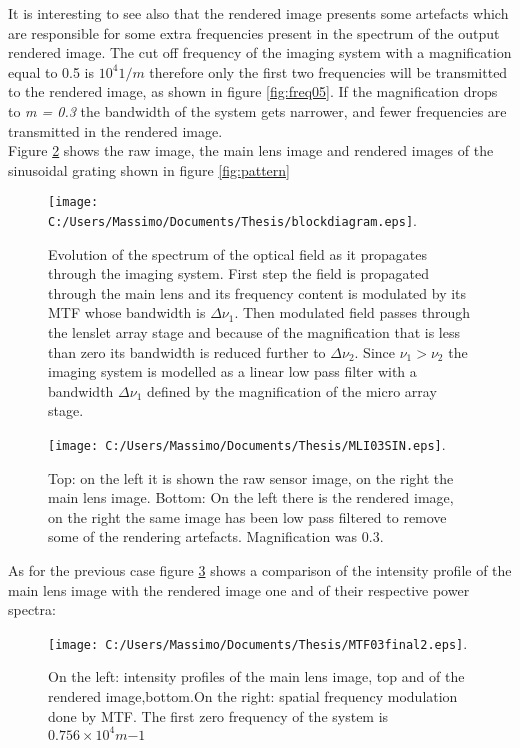   It is interesting to see also that the rendered image presents some artefacts which are responsible for some extra frequencies present in the spectrum of the output rendered image. The cut off frequency of the imaging system with a magnification equal to 0.5 is $10^4 1/m$ therefore only the first two frequencies will be transmitted to the rendered image, as shown in figure \ref{fig:freq05}.
    If the magnification drops to \textit{m = 0.3} the bandwidth of the system gets narrower, and fewer frequencies are transmitted in the rendered image.
    \\
    Figure \ref{fig:image03} shows the raw image, the main lens image and rendered images of the sinusoidal grating shown in figure \ref{fig:pattern}
  \begin{figure}[H]
  	\centering
  	\texttt{[image: C:/Users/Massimo/Documents/Thesis/blockdiagram.eps]}.
  	\caption{\label{fig:block} Evolution of the spectrum of the optical field as it propagates through the imaging system. First step the field is propagated through the main lens and its frequency content is modulated by its MTF whose bandwidth is $\Delta \nu_1$. Then modulated field passes through the lenslet array stage and because of the magnification that is less than zero its bandwidth is reduced further to $\Delta \nu_2$. Since $\nu_1 > \nu_2$  the imaging system is modelled as a linear low pass filter with a bandwidth $\Delta \nu_1$ defined by the magnification of the micro array stage. }
  \end{figure}
 \begin{figure}[H]
 	\centering
 	\texttt{[image: C:/Users/Massimo/Documents/Thesis/MLI03SIN.eps]}.
 	\caption{\label{fig:image03} Top: on the left it is shown the raw sensor image, on the right the main lens image. Bottom: On the left there is the  rendered image, on the right the same image has been low pass filtered to remove some of the rendering artefacts. Magnification was 0.3. }
 \end{figure}
As for the previous case figure \ref{fig:freq03} shows a comparison of the intensity profile of the main lens image with the rendered image one and of their respective power spectra: 
 \begin{figure}[H]
 	\centering
 	\texttt{[image: C:/Users/Massimo/Documents/Thesis/MTF03final2.eps]}.
 	\caption{\label{fig:freq03} On the left: intensity profiles of the main lens image, top and of the rendered image,bottom.On the right: spatial frequency modulation done by MTF. The first zero frequency of the system is $0.756 \times 10^4 m{-1}$}
 \end{figure}
